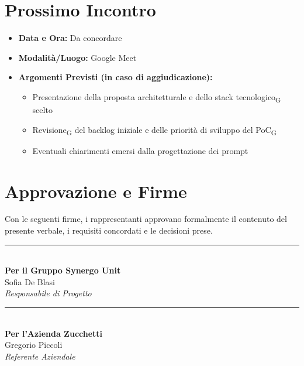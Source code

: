 \section{Prossimo Incontro}
\begin{itemize}
	\item \textbf{Data e Ora:} {Da concordare}
	\item \textbf{Modalità/Luogo:} {Google Meet}
	\item \textbf{Argomenti Previsti (in caso di aggiudicazione):}
	\begin{itemize}
		\item Presentazione della proposta architetturale e dello stack tecnologico\textsubscript{G} scelto
        \item Revisione\textsubscript{G} del backlog iniziale e delle priorità di sviluppo del PoC\textsubscript{G}
        \item Eventuali chiarimenti emersi dalla progettazione dei prompt
	\end{itemize}
\end{itemize}

\newpage
\section*{Approvazione e Firme}
Con le seguenti firme, i rappresentanti approvano formalmente il contenuto del presente verbale, i requisiti concordati e le decisioni prese.

\vspace{2.5cm}

\noindent
\begin{minipage}[c]{0.45\textwidth}
	\begin{center}
		\rule{6cm}{0.4pt} \\ 
		\vspace{0.2cm}
		\textbf{Per il Gruppo Synergo Unit} \\
		{Sofia De Blasi} \\
		\textit{Responsabile di Progetto}
	\end{center}
\end{minipage}
\hfill
\begin{minipage}[c]{0.45\textwidth}
	\begin{center}
		\rule{6cm}{0.4pt} \\ 
		\vspace{0.2cm}
		\textbf{Per l'Azienda Zucchetti} \\
		{Gregorio Piccoli} \\
		\textit{Referente Aziendale}
	\end{center}
\end{minipage}

\vspace{2cm}
